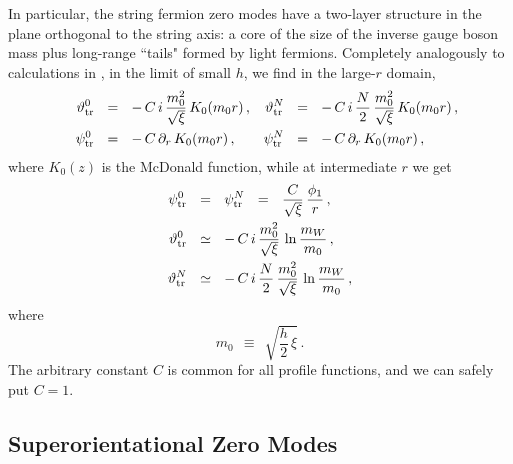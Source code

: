 \documentclass[12pt]{article}
\newcommand{\p}{\partial}
\newcommand{\pts}{\psi_{\rm tr}^0}
\newcommand{\ptN}{\psi_{\rm tr}^N}
\newcommand{\tts}{\vartheta_{\rm tr}^0}
\newcommand{\ttN}{\vartheta_{\rm tr}^N}
\begin{document}
In particular, the string fermion zero modes have a two-layer structure in the plane
orthogonal to the string axis: a core of the size of the inverse gauge boson mass plus long-range
``tails" formed by light fermions.
	Completely analogously to calculations in \cite{GSYmmodel,BSYhet}, in the limit of 
	small $h$, we find in the large-$r$ domain,
\begin{align*}
%
	&& \tts &~~=~~ -\, C\,i\,\frac{m_0^2}{\sqrt{\xi}}\, K_0(m_0 r) \,,
	& \ttN & ~~=~~ -\, C\,i\,\frac{N}{2}\,\frac{m_0^2}{\sqrt{\xi}}\,K_0(m_0 r)\,, \\
%
	&& \pts &~~=~~ -\, C\,\p_r\,K_0(m_0 r) \,,
	& \ptN & ~~=~~ -\, C\,\p_r\,K_0(m_0 r)\,,
\end{align*}
	where $ K_0(z) $ is the McDonald function, 
	while at intermediate $ r $ we get
\begin{align*}
%
	\pts & ~~=~~ \ptN ~~=~~ \frac{C}{\sqrt{\xi}}\,\frac{\phi_1}{r}\,,
	\\
%
	\tts & ~~\simeq~~ -\,C\,i\,\frac{m_0^2}{\sqrt{\xi}}\,\ln\frac{m_W}{m_0}\,,
	\\
%
	\ttN & ~~\simeq~~ -\,C\,i\,\frac{N}{2}\,\frac{m_0^2}{\sqrt{\xi}}\,\ln\frac{m_W}{m_0}\,,
\end{align*}
where 
\[
	m_0 ~~\equiv~~ \sqrt{\frac{h}{2}\, \xi}\,.
\]
	The arbitrary constant $ C $ is common for all profile functions, and we can safely put
	 $ C = 1 $.


\subsection{Superorientational Zero Modes}
\end{document}
